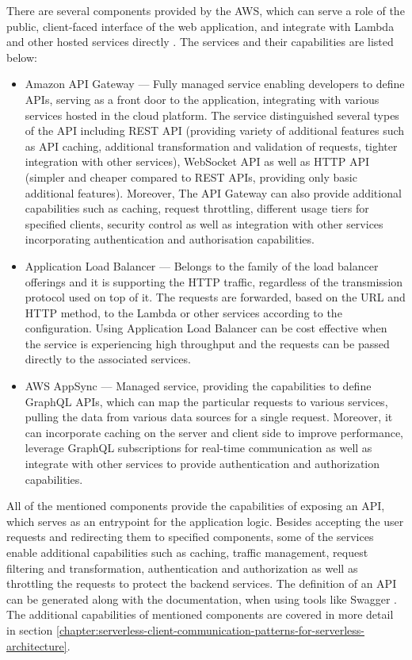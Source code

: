 There are several components provided by the AWS, which can serve a role of the public, client-faced interface of the web application, and integrate with Lambda and other hosted services directly \cite{AWSReinventBuildingMicroservicesWithAWSLambda}. The services and their capabilities are listed below:

\begin{itemize}
   \item Amazon API Gateway ---
   Fully managed service enabling developers to define APIs, serving as a front door to the application, integrating with various services hosted in the cloud platform.
   The service distinguished several types of the API including REST API (providing variety of additional features such as API caching, additional transformation and validation of requests, tighter integration with other services), WebSocket API as well as HTTP API (simpler and cheaper compared to REST APIs, providing only basic additional features).
   Moreover, The API Gateway can also provide additional capabilities such as caching, request throttling, different usage tiers for specified clients, security control as well as integration with other services incorporating authentication and authorisation capabilities.
   \item Application Load Balancer ---
   Belongs to the family of the load balancer offerings and it is supporting the HTTP traffic, regardless of the transmission protocol used on top of it.
   The requests are forwarded, based on the URL and HTTP method, to the Lambda or other services according to the configuration.
   Using Application Load Balancer can be cost effective when the service is experiencing high throughput and the requests can be passed directly to the associated services.
   \item AWS AppSync ---
   Managed service, providing the capabilities to define GraphQL APIs, which can map the particular requests to various services, pulling the data from various data sources for a single request.
   Moreover, it can incorporate caching on the server and client side to improve performance, leverage GraphQL subscriptions for real-time communication as well as integrate with other services to provide authentication and authorization capabilities.
\end{itemize}

All of the mentioned components provide the capabilities of exposing an API, which serves as an entrypoint for the application logic.
Besides accepting the user requests and redirecting them to specified components, some of the services enable additional capabilities such as caching, traffic management, request filtering and transformation, authentication and authorization as well as throttling the requests to protect the backend services.
The definition of an API can be generated along with the documentation, when using tools like Swagger \cite{ImplementingMicroservicesOnAWS}.
The additional capabilities of mentioned components are covered in more detail in section \ref{chapter:serverless-client-communication-patterns-for-serverless-architecture}.

